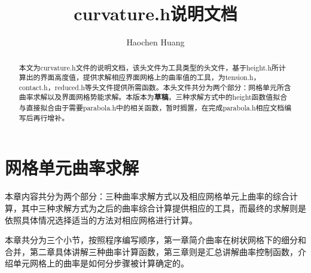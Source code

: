 \documentclass[lang=cn,11pt,a4paper]{elegantpaper}
\title{curvature.h说明文档}
\author{Haochen Huang}
\date{\zhtoday}
\begin{document}
\maketitle
\begin{abstract}
  本文为curvature.h文件的说明文档，该头文件为工具类型的头文件，基于height.h所计算出的界面高度值，提供求解相应界面网格上的曲率值的工具，为tension.h，contact.h，reduced.h等头文件提供所需函数。本头文件共分为两个部分：网格单元所含曲率求解以及界面网格势能求解。本版本为\textbf{草稿}，三种求解方式中的height函数值拟合与直接拟合由于需要parabola.h中的相关函数，暂时搁置，在完成parabola.h相应文档编写后再行增补。
\end{abstract}

\tableofcontents

\section{网格单元曲率求解}
本章内容共分为两个部分：三种曲率求解方式以及相应网格单元上曲率的综合计算，其中三种求解方式为之后的曲率综合计算提供相应的工具，而最终的求解则是依照具体情况选择适当的方法对相应网格进行计算。\par
本章共分为三个小节，按照程序编写顺序，第一章简介曲率在树状网格下的细分和合并，第二章具体讲解三种曲率计算函数，第三章则是汇总讲解曲率控制函数，介绍单元网格上的曲率是如何分步骤被计算确定的。
\end{document}
